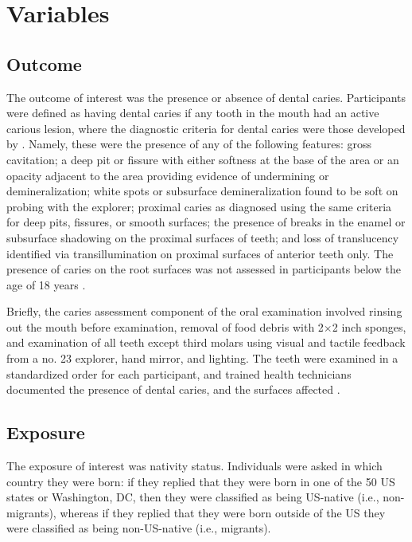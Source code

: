 \section{Variables}

\subsection{Outcome}

The outcome of interest was the presence or absence of dental caries. Participants were defined as having dental caries if any tooth in the mouth had an active carious lesion, where the diagnostic criteria for dental caries were those developed by \citet{radike1968}. Namely, these were the presence of any of the following features: gross cavitation; a deep pit or fissure with either softness at the base of the area or an opacity adjacent to the area providing evidence of undermining or demineralization; white spots or subsurface demineralization found to be soft on probing with the explorer; proximal caries as diagnosed using the same criteria for deep pits, fissures, or smooth surfaces; the presence of breaks in the enamel or subsurface shadowing on the proximal surfaces of teeth; and loss of translucency identified via transillumination on proximal surfaces of anterior teeth only. The presence of caries on the root surfaces was not assessed in participants below the age of 18 years \citep{bashir2022}.

Briefly, the caries assessment component of the oral examination involved rinsing out the mouth before examination, removal of food debris with 2$\times$2 inch sponges, and examination of all teeth except third molars using visual and tactile feedback from a no. 23 explorer, hand mirror, and lighting. The teeth were examined in a standardized order for each participant, and trained health technicians documented the presence of dental caries, and the surfaces affected \citep{bashir2022}.

\subsection{Exposure}

The exposure of interest was nativity status. Individuals were asked in which country they were born: if they replied that they were born in one of the 50 US states or Washington, DC, then they were classified as being US-native (i.e., non-migrants), whereas if they replied that they were born outside of the US they were classified as being non-US-native (i.e., migrants).

